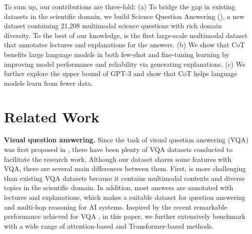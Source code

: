 To sum up, our contributions are three-fold: 
(a) To bridge the gap in existing datasets in the scientific domain, we build Science Question Answering (\name{}), a new dataset containing 21,208 multimodal science questions with rich domain diversity. To the best of our knowledge, \name{} is the first large-scale multimodal dataset that annotates lectures and explanations for the answers.
(b) We show that CoT benefits large language models in both few-shot and fine-tuning learning by improving model performance and reliability via generating explanations.
(c) We further explore the upper bound of GPT-3 and show that CoT helps language models learn from fewer data.

\section{Related Work}
\label{sec:related} 

\noindent \textbf{Visual question answering.} Since the task of visual question answering (VQA) was first proposed in \cite{antol2015vqa}, there have been plenty of VQA datasets \cite{balanced_binary_vqa,zhu2016cvpr,krishna2017visual,balanced_vqa_v2,johnson2017clevr,hudson2019gqa} conducted to facilitate the research work. Although our \name{} dataset shares some features with VQA, there are several main differences between them. First, \name{} is more challenging than existing VQA datasets because it contains multimodal contexts and diverse topics in the scientific domain. In addition, most answers are annotated with lectures and explanations, which makes \name{} a suitable dataset for  question answering and multi-hop reasoning for AI systems. Inspired by the recent remarkable performance achieved for VQA \cite{lu2018co,lu2018rvqa,gao2018question,gao2019dynamic,li2019visualbert,dosovitskiy2020image}, in this paper, we further extensively benchmark \name{} with a wide range of attention-based \cite{Anderson2017up,lu2018co,Kim2018,gao2019dynamic} and Transformer-based \cite{lu2019vilbert,li2019visualbert,li2020does,dosovitskiy2020image} methods.

